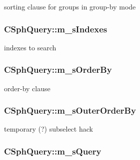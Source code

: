 sorting clause for groups in group-\/by mode 

\hypertarget{classCSphQuery_a45a23107b5561879993db1c25161b7ac}{
\subsubsection[{m\-\_\-s\-Indexes}]{ C\-Sph\-Query\-::m\-\_\-s\-Indexes}}\label{classCSphQuery_a45a23107b5561879993db1c25161b7ac}


indexes to search 

\hypertarget{classCSphQuery_a91973e6042966eea08b88b56a8950da5}{
\subsubsection[{m\-\_\-s\-Order\-By}]{ C\-Sph\-Query\-::m\-\_\-s\-Order\-By}}\label{classCSphQuery_a91973e6042966eea08b88b56a8950da5}


order-\/by clause 

\hypertarget{classCSphQuery_a964070184c2d3aff30550fe2d7da73dd}{
\subsubsection[{m\-\_\-s\-Outer\-Order\-By}]{ C\-Sph\-Query\-::m\-\_\-s\-Outer\-Order\-By}}\label{classCSphQuery_a964070184c2d3aff30550fe2d7da73dd}


temporary (?) subselect hack 

\hypertarget{classCSphQuery_a532a2ff6c5f30e1d8d7ae2261763d460}{
\subsubsection[{m\-\_\-s\-Query}]{ C\-Sph\-Query\-::m\-\_\-s\-Query}}\label{classCSphQuery_a532a2ff6c5f30e1d8d7ae2261763d460}


